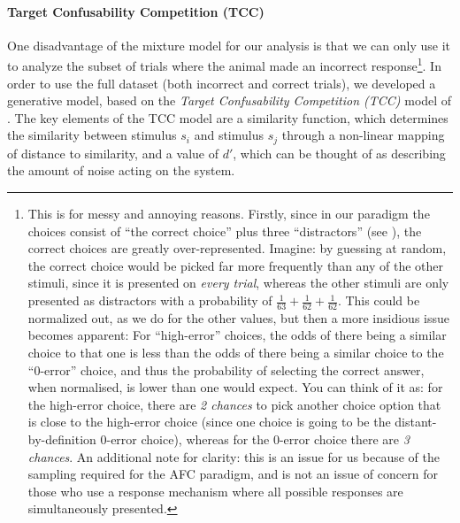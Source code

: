 \paragraph{Target Confusability Competition (TCC)}\label{para:TCC}
One disadvantage of the mixture model for our analysis is that we can only use it to analyze the subset of trials where the animal made an incorrect response\footnote{
This is for messy and annoying reasons. 
Firstly, since in our paradigm the choices consist of ``the correct choice'' plus three ``distractors'' (see ), the correct choices are greatly over-represented. 
Imagine: by guessing at random, the correct choice would be picked far more frequently than any of the other stimuli, since it is presented on \emph{every trial}, whereas the other stimuli are only presented as distractors with a probability of $\frac{1}{63} + \frac{1}{62} + \frac{1}{62}$. 
This could be normalized out, as we do for the other values, but then a more insidious issue becomes apparent: 
For ``high-error'' choices, the odds of there being a similar choice to that one is less than the odds of there being a similar choice to the ``0-error'' choice, and thus the probability of selecting the correct answer, when normalised, is lower than one would expect. 
You can think of it as: for the high-error choice, there are \emph{2 chances} to pick another choice option that is close to the high-error choice (since one choice is going to be the distant-by-definition 0-error choice), whereas for the 0-error choice there are \emph{3 chances}.
An additional note for clarity: this is an issue for us because of the sampling required for the AFC paradigm, and is not an issue of concern for those who use a response mechanism where all possible responses are simultaneously presented.
}.
In order to use the full dataset (both incorrect and correct trials), we developed a generative model, based on the \emph{Target Confusability Competition (TCC)} model of \cite{schurgin_psychophysical_2020}.
The key elements of the TCC model are a similarity function, which determines the similarity between stimulus $s_i$ and stimulus $s_j$ through a non-linear mapping of distance to similarity, and a value of $d'$, which can be thought of as describing the amount of noise acting on the system. 
